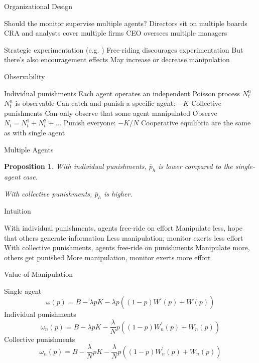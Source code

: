 \documentclass[usenames,dvipsnames]{beamer}
\newcommand{\bo}{\begin{outline}}
\newcommand{\eo}{\end{outline}}
\newtheorem{proposition}{Proposition}
\begin{document}
\begin{frame}{Organizational Design}
\bo
\1 Should the monitor supervise multiple agents?
\2 Directors sit on multiple boards 
\2 CRA and analysts cover multiple firms
\2 CEO oversees multiple managers

\1 Strategic experimentation (e.g. \cite{bolton_strategic_1999})
\2 Free-riding discourages experimentation 
\2 But there's also encouragement effects
\1 May increase or decrease manipulation
\eo
\end{frame}

\begin{frame}{Observability}
\bo
\1 Individual punishments
\2 Each agent operates an independent Poisson process $N_t^{n}$
\2 $N_t^n$ is observable
\2 Can catch and punish a specific agent: $-K$
\1 Collective punishments
\2 Can only observe that some agent manipulated
\2 Observe $N_t=N_t^{1}+N_t^{2}+...$
\2 Punish everyone: $-K/N$
\1 Cooperative equilibria are the same as with single agent
\eo
\end{frame}

\begin{frame}{Multiple Agents}
\begin{proposition}
        With individual punishments, $\bar{p}_h$ is lower compared to the single-agent case.
        
        With collective punishments, $\bar{p}_h$ is higher.
\end{proposition}

\end{frame}

\begin{frame}{Intuition}
\bo
\1 With individual punishments, agents free-ride on effort
\2 Manipulate less, hope that others generate information
\2 Less manipulation, monitor exerts less effort
\1 With collective punishments, agents free-ride on punishments
\2 Manipulate more, others get punished
\2 More manipulation, monitor exerts more effort
\eo
\end{frame}

\begin{frame}{Value of Manipulation}
\bo
\1 Single agent
\begin{equation*}
\omega \left( p\right) =B-\lambda p K - \lambda p\left( \left( 1-p\right)W^{\prime }(p) + W(p)\right) \label{eq:Omega-p}
\end{equation*}%
\1 Individual punishments
\begin{equation*}
\omega _{n}\left( p\right) =B-\lambda pK-\frac{\lambda }{N}p \left( \left(
1-p\right) W_{n}^{\prime }\left( p\right) + W_{n}\left(
p\right) \right)
\end{equation*}
\1 Collective punishments
\begin{equation*}
\omega _{n}\left( p\right) =B-\frac{\lambda }{N}pK-\frac{\lambda }{N}p\left(
\left( 1-p\right) W_{n}^{\prime }\left( p\right) +W_{n}\left( p\right)
\right)  
\end{equation*}%

\eo
\end{frame}
\end{document}
